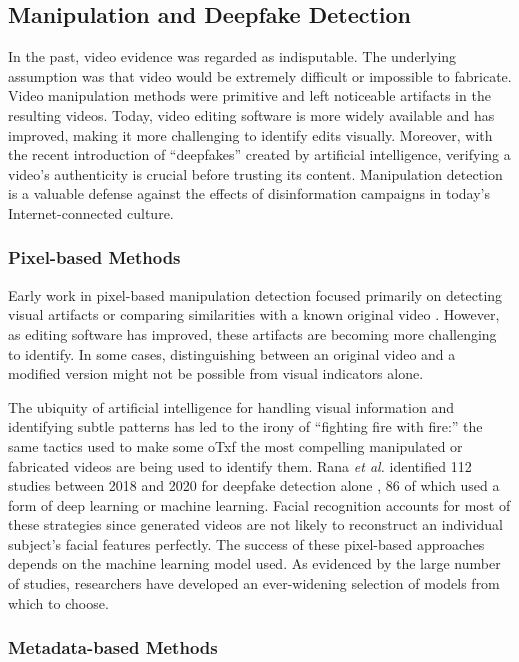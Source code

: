 \subsection{Manipulation and Deepfake Detection}

In the past, video evidence was regarded as indisputable. The underlying assumption was that video would be extremely difficult or impossible to fabricate. Video manipulation methods were primitive and left noticeable artifacts in the resulting videos. Today, video editing software is more widely available and has improved, making it more challenging to identify edits visually. Moreover, with the recent introduction of ``deepfakes'' created by artificial intelligence, verifying a video's authenticity is crucial before trusting its content. Manipulation detection is a valuable defense against the effects of disinformation campaigns in today's Internet-connected culture.

\subsubsection{Pixel-based Methods}

Early work in pixel-based manipulation detection focused primarily on detecting visual artifacts or comparing similarities with a known original video \cite{milani2012}. However, as editing software has improved, these artifacts are becoming more challenging to identify. In some cases, distinguishing between an original video and a modified version might not be possible from visual indicators alone.

The ubiquity of artificial intelligence for handling visual information and identifying subtle patterns has led to the irony of ``fighting fire with fire:'' the same tactics used to make some oTxf the most compelling manipulated or fabricated videos are being used to identify them. Rana \emph{et al.} identified 112 studies between 2018 and 2020 for deepfake detection alone \cite{rana2022}, 86 of which used a form of deep learning or machine learning. Facial recognition accounts for most of these strategies since generated videos are not likely to reconstruct an individual subject's facial features perfectly. The success of these pixel-based approaches depends on the machine learning model used. As evidenced by the large number of studies, researchers have developed an ever-widening selection of models from which to choose.

\subsubsection{Metadata-based Methods}

